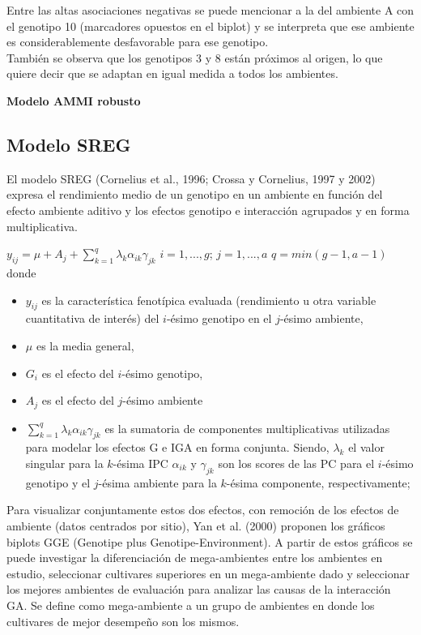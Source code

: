 Entre las altas asociaciones negativas se puede mencionar a la del ambiente A con el genotipo 10
(marcadores opuestos en el biplot) y se interpreta que ese ambiente es considerablemente desfavorable
para ese genotipo.\\
También se observa que los genotipos 3 y 8 están próximos al origen, lo que quiere decir que se
adaptan en igual medida a todos los ambientes.

\textbf{Modelo AMMI robusto}


\subsection{Modelo SREG}

El modelo SREG (Cornelius et al., 1996; Crossa y Cornelius, 1997 y 2002) expresa el rendimiento medio de un genotipo en un ambiente en función del efecto ambiente aditivo y los efectos genotipo e interacción agrupados y en forma multiplicativa.


$y_{ij}= \mu +  A_j + \sum_{k=1}^q \lambda_k \alpha_{ik} \gamma_{jk}$ \vspace{1cm} $ i=1,...,g$; $ j=1,...,a$ $q=min(g-1,a-1)$
donde 
\begin{itemize}
\item $y_{ij}$ es la característica fenotípica evaluada (rendimiento u otra variable cuantitativa de interés) del $i$-ésimo genotipo en el $j$-ésimo ambiente,
\item $\mu$ es la media general,
\item  $G_i$ es el efecto del $i$-ésimo genotipo,
\item $A_j$ es el efecto del $j$-ésimo ambiente
\item $\sum_{k=1}^q \lambda_k \alpha_{ik} \gamma_{jk}$ es la sumatoria de componentes multiplicativas utilizadas para modelar los efectos G e IGA en forma conjunta. Siendo, $\lambda_k$ el valor singular para la  $k$-ésima IPC $\alpha_{ik}$ y $\gamma_{jk}$ son los scores de las PC para el $i$-ésimo genotipo y el $j$-ésima ambiente para la $k$-ésima componente, respectivamente;
\end{itemize}


Para visualizar conjuntamente estos dos efectos, con remoción de los efectos de ambiente (datos centrados por sitio), Yan et al. (2000) proponen los gráficos biplots GGE (Genotipe plus Genotipe-Environment). A partir de estos gráficos se puede investigar la diferenciación de mega-ambientes entre los ambientes en estudio, seleccionar cultivares superiores en un mega-ambiente dado y seleccionar los mejores ambientes de evaluación para analizar las causas de la interacción GA. Se define como mega-ambiente a un grupo de ambientes en donde los cultivares de mejor desempeño son los mismos.

